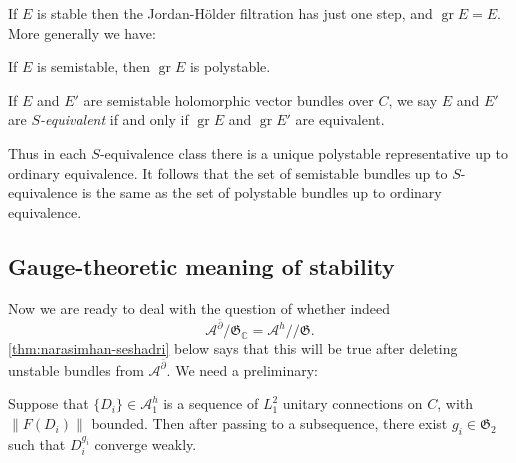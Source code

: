 \documentclass[12pt,letterpaper,reqno]{article}
\numberwithin{equation}{section}
\newcommand{\fG}{{\mathfrak G}}
\newcommand{\cA}{\ensuremath{\mathcal A}}
\newcommand{\C}{\ensuremath{\mathbb C}}
\newcommand{\kq}{/\!\!/}
\newcommand{\norm}[1]{\lVert#1\rVert}
\newcommand{\ti}[1]{\textit{#1}}
\DeclareMathOperator{\gr}{gr}
\newcommand{\fixme}[1]{{\color{orange}{[#1]}}}
\begin{document}


If $E$ is stable then the Jordan-H\"older filtration has
just one step, and $\gr E = E$. More generally we have:

\begin{prop}
If $E$ is semistable, then $\gr E$ is polystable.
\end{prop}

\begin{defn}[$S$-equivalence] If $E$ and $E'$ are semistable
holomorphic vector bundles over $C$, we say $E$ and $E'$ are
\ti{$S$-equivalent} if and only if $\gr E$ and $\gr E'$ are
equivalent.
\end{defn}

Thus in each $S$-equivalence class there is a unique polystable
representative up to ordinary equivalence.
It follows that the set of semistable bundles
up to $S$-equivalence is the same as the set of polystable bundles
up to ordinary equivalence.


\subsection{Gauge-theoretic meaning of stability}

Now we are ready to deal with the question of whether indeed
\begin{equation}
  \cA^{\bar\partial} / \fG_\C = \cA^h \kq \fG.
\end{equation}
\autoref{thm:narasimhan-seshadri} below says that this will be true
after deleting unstable bundles from $\cA^{\bar\partial}$.
We need a preliminary:

\begin{thm} \label{thm:uhlenbeck-weak}
Suppose that $\{D_i\} \in \cA^h_1$ is a sequence of $L^2_1$ unitary
connections on $C$, with $\norm{F(D_i)}$ bounded. Then after passing
to a subsequence, there exist $g_i \in \fG_2$ such that $D_i^{g_i}$
converge weakly.
\end{thm}
\end{document}
